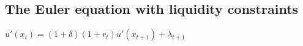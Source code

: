 
\subsection{The Euler equation with liquidity constraints}

\(u'(x_t)=(1+\delta)(1+r_t)u'(x_{t+1})+\lambda_{t+1}\)

